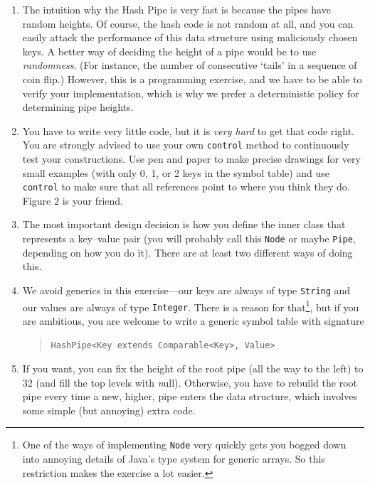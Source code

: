 \documentclass{tufte-handout}
\begin{document}
\begin{enumerate}
  \item The intuition why the Hash Pipe is very fast is because the pipes have random heights.
Of course, the hash code is not random at all, and you can easily attack the performance of this data structure using maliciously chosen keys. 
A better way of deciding the height of a pipe would be to use \emph{randomness}.
(For instance, the number of consecutive `tails' in a sequence of coin flip.)
However, this is a programming exercise, and we have to be able to verify your implementation, which is why we prefer a deterministic policy for determining pipe heights.

  \item You have to write very little code, but it is \emph{very hard} to get that code right.
    You are strongly advised to use your own {\tt control} method to continuously test your constructions.
    Use pen and paper to make precise drawings for very small examples (with only 0, 1, or 2 keys in the symbol table) and use {\tt control} to make sure that all references point to where you think they do. 
    Figure 2 is your friend.

  \item The most important design decision is how you define the inner class that represents a key--value pair (you will probably call this {\tt Node} or maybe {\tt Pipe}, depending on how you do it).
      There are at least two different ways of doing this.

    \item We avoid generics in this exercise---our keys are always of type {\tt String} and our values are always of type {\tt Integer}.
      There is a reason for that\footnote{One of the ways of implementing {\tt Node} very quickly gets you bogged down into annoying details of Java's type system for generic arrays. So this restriction makes the exercise a lot easier.}, but if you are ambitious, you are welcome to write a generic symbol table with signature 
    \begin{quote}
    \tt HashPipe<Key extends Comparable<Key>, Value>
    \end{quote} 

    \item If you want, you can fix the height of the root pipe (all the way to the left) to 32 (and fill the top levels with {\emph null}).
      Otherwise, you have to rebuild the root pipe every time a new, higher, pipe enters the data structure, which involves some simple (but annoying) extra code.


\end{enumerate}
\end{document}
